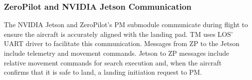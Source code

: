 \subsubsection{ZeroPilot and NVIDIA Jetson Communication}
\label{sec:zp-jetson-communication}

The NVIDIA Jetson and ZeroPilot's PM submodule communicate during flight to
ensure the aircraft is accurately aligned with the landing pad. TM uses LOS'
UART driver to facilitate this communication. Messages from ZP to the Jetson
include telemetry and movement commands. Jetson to ZP messages include relative
movement commands for search execution and, when the aircraft confirms that it
is safe to land, a landing initiation request to PM.

